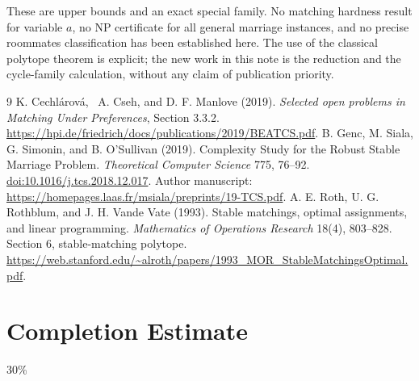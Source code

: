 \documentclass[11pt,a4paper]{article}
\theoremstyle{definition}
\theoremstyle{remark}
\begin{document}
These are upper bounds and an exact special family. No matching hardness result for variable $a$, no NP certificate for all general marriage instances, and no precise roommates classification has been established here. The use of the classical polytope theorem is explicit; the new work in this note is the reduction and the cycle-family calculation, without any claim of publication priority.
\begin{thebibliography}{9}
 K. Cechl\'arov\'a, \ A. Cseh, and D. F. Manlove (2019).
\emph{Selected open problems in Matching Under Preferences}, Section 3.3.2.
\url{https://hpi.de/friedrich/docs/publications/2019/BEATCS.pdf}.
 B. Genc, M. Siala, G. Simonin, and B. O'Sullivan (2019).
Complexity Study for the Robust Stable Marriage Problem.
\emph{Theoretical Computer Science} 775, 76--92.
\href{https://doi.org/10.1016/j.tcs.2018.12.017}{doi:10.1016/j.tcs.2018.12.017}.
Author manuscript: \url{https://homepages.laas.fr/msiala/preprints/19-TCS.pdf}.
 A. E. Roth, U. G. Rothblum, and J. H. Vande Vate (1993).
Stable matchings, optimal assignments, and linear programming.
\emph{Mathematics of Operations Research} 18(4), 803--828. Section 6, stable-matching polytope.
\url{https://web.stanford.edu/~alroth/papers/1993_MOR_StableMatchingsOptimal.pdf}.
\end{thebibliography}

\section{Completion Estimate}
30\%
\end{document}
